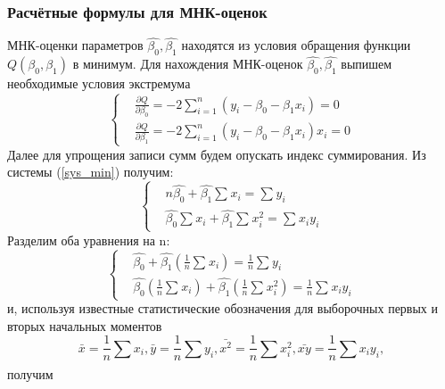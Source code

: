 	\subsubsection{Расчётные формулы для МНК-оценок}
	МНК-оценки параметров $\hat{\beta_0}, \hat{\beta_1}$ находятся из условия обращения функции $Q(\beta_0, \beta_1)$ в минимум. 
	\newline
	Для нахождения МНК-оценок $\hat{\beta_0}, \hat{\beta_1}$ выпишем необходимые условия экстремума
	\begin{equation}
	   \begin{cases}
         & \frac{\partial Q}{\partial \beta_{0}}  = 
         -2\sum_{i=1}^{n}{(y_{i} - \beta_{0} - \beta_{1}x_{i})} = 0\\ 
         & \frac{\partial Q}{\partial \beta_{1}}  = 
         -2\sum_{i=1}^{n}{(y_{i} - \beta_{0} - \beta_{1}x_{i})x_{i}} = 0 
       \end{cases}
       \label{sys_min}
	\end{equation}
	Далее для упрощения записи сумм будем опускать индекс суммирования. Из системы (\ref{sys_min}) получим:
	\begin{equation}
	   \begin{cases}
         & n\hat{\beta_{0}} + \hat{\beta_{1}}\sum_{}{}{x_{i}} = 
         \sum_{}{}{y_{i}}\\ 
        & \hat{\beta_{0}}\sum_{}{}{x_{i}} + \hat{\beta_{1}}\sum_{}{}{x_{i}^{2}} = \sum_{}{}{x_{i}y_{i}}
       \end{cases}
       \label{sys_2}
	\end{equation}
	Разделим оба уравнения на n:
	\begin{equation}
	   \begin{cases}
         & \hat{\beta_{0}} + \hat{\beta_{1}}(\frac{1}{n}\sum_{}{}{x_{i}}) = 
         \frac{1}{n}\sum_{}{}{y_{i}}\\ 
        & \hat{\beta_{0}}(\frac{1}{n}\sum_{}{}{x_{i}}) + \hat{\beta_{1}}(\frac{1}{n}\sum_{}{}{x_{i}^{2}}) = \frac{1}{n}\sum_{}{}{x_{i}y_{i}}
       \end{cases}
       \label{sys_3}
	\end{equation}
	и, используя известные статистические обозначения для выборочных первых и вторых начальных моментов
	\begin{equation}
	    \bar{x} = \frac{1}{n}\sum_{}{}{x_{i}}, \bar{y} = \frac{1}{n}\sum_{}{}{y_{i}}, \bar{x^{2}} = \frac{1}{n}\sum_{}{}{x_{i}^{2}}, \bar{xy} = \frac{1}{n}\sum_{}{}{x_{i}y_{i}}, 
	\end{equation}
	получим
